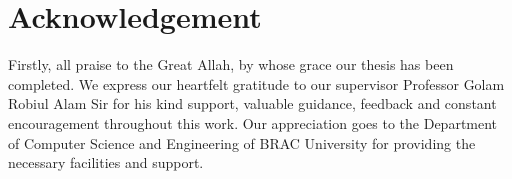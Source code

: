 \section*{Acknowledgement}
Firstly, all praise to the Great Allah, by whose grace our thesis has been completed. We express our heartfelt gratitude to our supervisor Professor Golam Robiul Alam Sir for his kind support, valuable guidance, feedback and constant encouragement throughout this work. Our appreciation goes to the Department of Computer Science and Engineering of BRAC University for providing the necessary facilities and support.